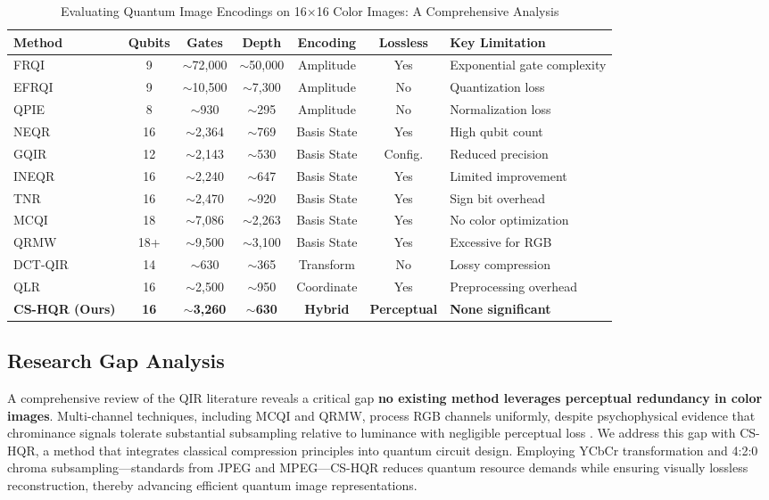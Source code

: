 \documentclass[11pt,a4paper]{article}
\begin{document}
\begin{table}[t]
\centering
\caption{ Evaluating Quantum Image Encodings on 16×16 Color Images: A Comprehensive Analysis}
\label{tab:method_comparison}
\small
\begin{tabular}{@{}lcccccp{3.5cm}@{}}
\toprule
\textbf{Method} & \textbf{Qubits} & \textbf{Gates} & \textbf{Depth} & \textbf{Encoding} & \textbf{Lossless} & \textbf{Key Limitation} \\
\midrule
FRQI \cite{ref3} & 9 & $\sim$72,000 & $\sim$50,000 & Amplitude & Yes & Exponential gate complexity \\
EFRQI \cite{ref32} & 9 & $\sim$10,500 & $\sim$7,300 & Amplitude & No & Quantization loss \\
QPIE \cite{ref24} & 8 & $\sim$930 & $\sim$295 & Amplitude & No & Normalization loss \\
NEQR \cite{ref4} & 16 & $\sim$2,364 & $\sim$769 & Basis State & Yes & High qubit count \\
GQIR \cite{ref18} & 12 & $\sim$2,143 & $\sim$530 & Basis State & Config. & Reduced precision \\
INEQR \cite{ref33} & 16 & $\sim$2,240 & $\sim$647 & Basis State & Yes & Limited improvement \\
TNR \cite{ref4} & 16 & $\sim$2,470 & $\sim$920 & Basis State & Yes & Sign bit overhead \\
MCQI \cite{ref8} & 18 & $\sim$7,086 & $\sim$2,263 & Basis State & Yes & No color optimization \\
QRMW \cite{ref34} & 18+ & $\sim$9,500 & $\sim$3,100 & Basis State & Yes & Excessive for RGB \\
DCT-QIR \cite{ref25} & 14 & $\sim$630 & $\sim$365 & Transform & No & Lossy compression \\
QLR \cite{ref19} & 16 & $\sim$2,500 & $\sim$950 & Coordinate & Yes & Preprocessing overhead \\
\midrule
\textbf{CS-HQR (Ours)} & \textbf{16} & $\sim$\textbf{3,260} & $\sim$\textbf{630} & \textbf{Hybrid} & \textbf{Perceptual} & \textbf{None significant} \\
\bottomrule
\end{tabular}
\end{table}

\subsection{Research Gap Analysis}
A comprehensive review of the QIR literature reveals a critical gap \textbf {no existing method leverages perceptual redundancy in color images}. Multi-channel techniques, including MCQI and QRMW, process RGB channels uniformly, despite psychophysical evidence that chrominance signals tolerate substantial subsampling relative to luminance with negligible perceptual loss \cite{ref4, ref8}.
We address this gap with CS-HQR, a method that integrates classical compression principles into quantum circuit design. Employing YCbCr transformation and 4:2:0 chroma subsampling—standards from JPEG and MPEG—CS-HQR reduces quantum resource demands while ensuring visually lossless reconstruction, thereby advancing efficient quantum image representations.
\end{document}

